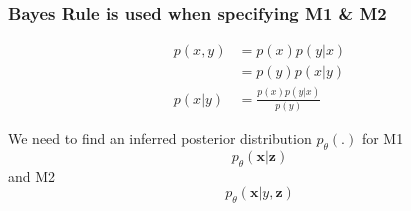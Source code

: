 \documentclass{beamer}
\begin{document}
\begin{frame}
  \frametitle{Bayes Rule is used when specifying M1 \& M2}

  \begin{align*}
    p(x,y) &= p(x)p(y|x) \\
    &= p(y)p(x|y) \\
    p(x|y) &= \frac{p(x)p(y|x)}{p(y)}
  \end{align*}

  We need to find an inferred posterior distribution $p_\theta (.)$ \newline
  for M1 \footnotemark
  \[p_\theta (\mathbf{x}|\mathbf{z})\] and
  M2 \footnotemark \[p_\theta (\mathbf{x}|y, \mathbf{z})\]


  
  \end{frame}
 
\end{document}

